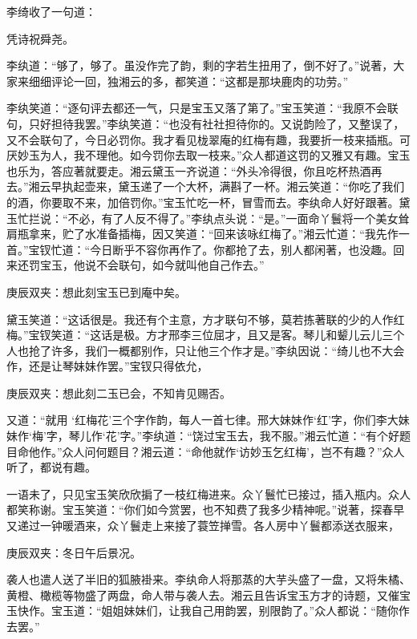 \begin{parag}
    李绮收了一句道：
\end{parag}


\begin{poem}
    \begin{pl} 凭诗祝舜尧。\end{pl}
\end{poem}


\begin{parag}
    李纨道：“够了，够了。虽没作完了韵，剩的字若生扭用了，倒不好了。”说著，大家来细细评论一回，独湘云的多，都笑道：“这都是那块鹿肉的功劳。”
\end{parag}


\begin{parag}
    李纨笑道：“逐句评去都还一气，只是宝玉又落了第了。”宝玉笑道：“我原不会联句，只好担待我罢。”李纨笑道：“也没有社社担待你的。又说韵险了，又整误了，又不会联句了，今日必罚你。我才看见栊翠庵的红梅有趣，我要折一枝来插瓶。可厌妙玉为人，我不理他。如今罚你去取一枝来。”众人都道这罚的又雅又有趣。宝玉也乐为，答应著就要走。湘云黛玉一齐说道：“外头冷得很，你且吃杯热酒再去。”湘云早执起壶来，黛玉递了一个大杯，满斟了一杯。湘云笑道：“你吃了我们的酒，你要取不来，加倍罚你。”宝玉忙吃一杯，冒雪而去。李纨命人好好跟著。黛玉忙拦说：“不必，有了人反不得了。”李纨点头说：“是。”一面命丫鬟将一个美女耸肩瓶拿来，贮了水准备插梅，因又笑道：“回来该咏红梅了。”湘云忙道：“我先作一首。”宝钗忙道：“今日断乎不容你再作了。你都抢了去，别人都闲著，也没趣。回来还罚宝玉，他说不会联句，如今就叫他自己作去。”\begin{note}庚辰双夹：想此刻宝玉已到庵中矣。\end{note}黛玉笑道：“这话很是。我还有个主意，方才联句不够，莫若拣著联的少的人作红梅。”宝钗笑道：“这话是极。方才邢李三位屈才，且又是客。琴儿和颦儿云儿三个人也抢了许多，我们一概都别作，只让他三个作才是。”李纨因说：“绮儿也不大会作，还是让琴妹妹作罢。”宝钗只得依允，\begin{note}庚辰双夹：想此刻二玉已会，不知肯见赐否。\end{note}又道：“就用 ‘红梅花’三个字作韵，每人一首七律。邢大妹妹作‘红’字，你们李大妹妹作‘梅’字，琴儿作‘花’字。”李纨道：“饶过宝玉去，我不服。”湘云忙道：“有个好题目命他作。”众人问何题目？湘云道：“命他就作‘访妙玉乞红梅’，岂不有趣？”众人听了，都说有趣。
\end{parag}


\begin{parag}
    一语未了，只见宝玉笑欣欣掮了一枝红梅进来。众丫鬟忙已接过，插入瓶内。众人都笑称谢。宝玉笑道：“你们如今赏罢，也不知费了我多少精神呢。”说著，探春早又递过一钟暖酒来，众丫鬟走上来接了蓑笠掸雪。各人房中丫鬟都添送衣服来，\begin{note}庚辰双夹：冬日午后景况。\end{note}袭人也遣人送了半旧的狐腋褂来。李纨命人将那蒸的大芋头盛了一盘，又将朱橘、黄橙、橄榄等物盛了两盘，命人带与袭人去。湘云且告诉宝玉方才的诗题，又催宝玉快作。宝玉道：“姐姐妹妹们，让我自己用韵罢，别限韵了。”众人都说：“随你作去罢。”
\end{parag}


